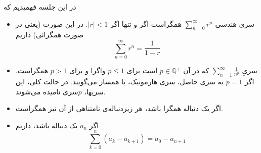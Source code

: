 \documentclass[12pt,a4paper]{article}
\theoremstyle{definition}
\begin{document}
\begin{framed}
در این جلسه فهمیدیم که
\begin{itemize}
\item 
سری هندسی 
$\sum_{n=0}^{\infty}r^n$
همگراست اگر و تنها اگر 
$|r|<1$.
در این صورت (یعنی در صورت همگرائی)‌ داریم
\[
\sum_{n=0}^{\infty}r^n=\frac{1}{1-r}
\]
\item 
سریِ
$\sum_{n=1}^\infty \frac{1}{n^p}$
که در آن
$p\in \mathbb{Q}^{+}$
است برای
$p\leq 1$
واگرا و برای
$p>1$
همگراست. 
اگر
$p=1$
به سری حاصل، سری هارمونیک، یا همساز می‌گویند. در حالت کلی، این سریها،
$p$سری
نامیده می‌شوند. 
\item 
اگر یک دنباله همگرا باشد، هر زیردنباله‌ی نامتناهی از آن نیز همگراست.
\item 
اگر
$a_n$
یک دنباله‌ باشد، داریم
\[
\sum_{k=0}^{n} (a_k-a_{k+1})=a_0-a_{n+1}
\]
\end{itemize}
\end{framed}
\end{document}

